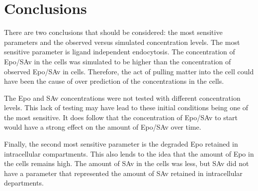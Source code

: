 \documentclass[12pt]{article}
\begin{document}
\section*{Conclusions}

There are two conclusions that should be considered: the most sensitive parameters and the observed versus simulated concentration levels. The most sensitive parameter is ligand independent endocytosis. The concentration of Epo/SAv in the cells was simulated to be higher than the concentration of observed Epo/SAv in cells. Therefore, the act of pulling matter into the cell could have been the cause of over prediction of the concentrations in the cells. 

The Epo and SAv concentrations were not tested with different concentration levels. This lack of testing may have lead to these initial conditions being one of the most sensitive. It does follow that the concentration of Epo/SAv to start would have a strong effect on the amount of Epo/SAv over time.

Finally, the second most sensitive parameter is the degraded Epo retained in intracellular compartments. This also lends to the idea that the amount of Epo in the cells remains high. The amount of SAv in the cells was less, but SAv did not have a parameter that represented the amount of SAv retained in intracellular departments.
\clearpage



\end{document}
